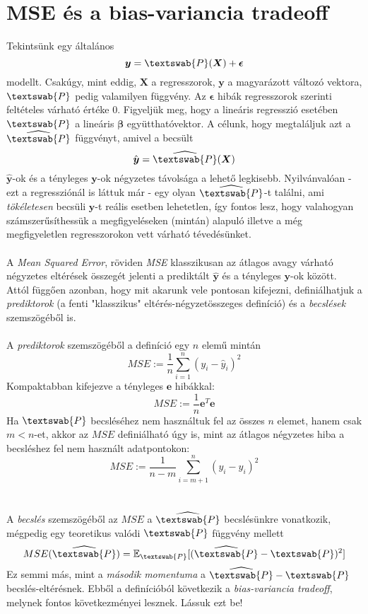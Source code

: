 \documentclass[14p]{report}
\def\pmb{\boldsymbol}
\def\e{\epsilon}
\newcounter{x}
\newcounter{y}
\newcounter{z}
\begin{document}
	\section{MSE és a bias-variancia tradeoff}
	Tekintsünk egy általános
	\[
		\pmb{y} = \textswab{P}(\pmb{X}) + \pmb{\e}
	\]
	modellt. Csakúgy, mint eddig, $\pmb{X}$ a regresszorok, $\pmb{y}$ a magyarázott változó vektora, $\textswab{P}$ pedig valamilyen függvény. Az $\pmb{\e}$ hibák regresszorok szerinti feltételes várható értéke $0$. Figyeljük meg, hogy a lineáris regresszió esetében $\textswab{P}$ a lineáris $\pmb{\beta}$ együtthatóvektor. A célunk, hogy megtaláljuk azt a $\widehat{\textswab{P}}$ függvényt, amivel a becsült
	\[
		\hat{\pmb{y}} = \widehat{\textswab{P}}(\pmb{X})
	\]
	$\hat{\pmb{y}}$-ok és a tényleges $\pmb{y}$-ok négyzetes távolsága a lehető legkisebb. Nyilvánvalóan - ezt a regressziónál is láttuk már - egy olyan $\widehat{\textswab{P}}$-t találni, ami \emph{tökéletesen} becsüli $\pmb{y}$-t reális esetben lehetetlen, így fontos lesz, hogy valahogyan számszerűsíthessük a megfigyeléseken (mintán) alapuló illetve a még megfigyeletlen regresszorokon vett várható tévedésünket.
	\\
	\\
	A \emph{Mean Squared Error}, röviden \emph{MSE} klasszikusan az átlagos avagy várható négyzetes eltérések összegét jelenti a prediktált $\hat{\pmb{y}}$ és a tényleges $\pmb{y}$-ok között. Attól függően azonban, hogy mit akarunk vele pontosan kifejezni, definiálhatjuk a \emph{prediktorok} (a fenti "klasszikus" eltérés-négyzetösszeges definíció) és a \emph{becslések} szemszögéből is. 
	\\
	\\
	A \emph{prediktorok} szemszögéből a definíció egy $n$ elemű mintán
	\[
		MSE := \frac{1}{n}\sum_{i=1}^{n}{(y_i - \hat{y}_i)^2}
	\]
	Kompaktabban kifejezve a tényleges $\pmb{e}$ hibákkal:
	\[
		MSE := \frac{1}{n}\pmb{e}^T\pmb{e}
	\]
	Ha $\textswab{P}$ becsléséhez nem használtuk fel az összes $n$ elemet, hanem csak $m < n$-et, akkor az $MSE$ definiálható úgy is, mint az átlagos négyzetes hiba a becsléshez fel nem használt adatpontokon:
	\[
		MSE := \frac{1}{n-m}\sum_{i=m+1}^{n}{(y_i - \hat{y}_i)^2}
	\]
	\\
	\\
	A \emph{becslés} szemszögéből az $MSE$ a $\widehat{\textswab{P}}$ becslésünkre vonatkozik, mégpedig egy teoretikus valódi $\textswab{P}$ függvény mellett
	\[
		MSE(\widehat{\textswab{P}}) = \mathbb{E}_{\textswab{P}}[(\widehat{\textswab{P}} - \textswab{P})^2]
	\]
	Ez semmi más, mint a \emph{második momentuma} a $\widehat{\textswab{P}} - \textswab{P}$ becslés-eltérésnek. Ebből a definícióból következik a \emph{bias-variancia tradeoff}, melynek fontos következményei lesznek. Lássuk ezt be!
\end{document}
